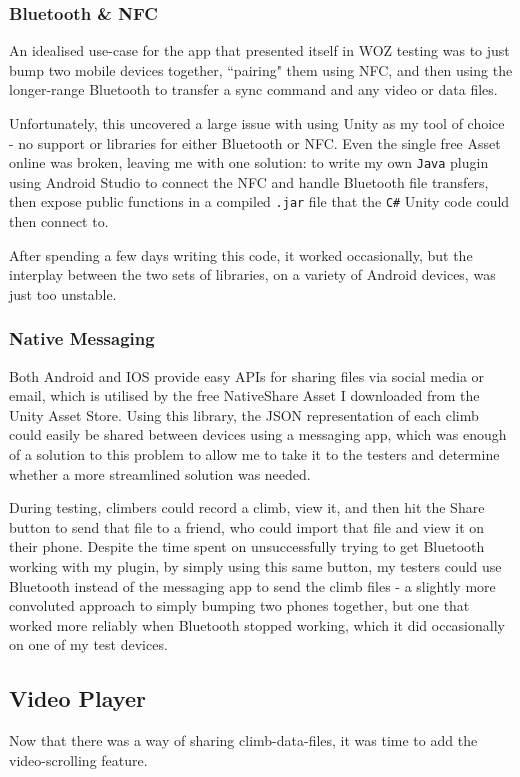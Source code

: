 \subsubsection{Bluetooth \& NFC}
An idealised use-case for the app that presented itself in WOZ testing was to just bump two mobile devices together, ``pairing" them using NFC, and then using the longer-range Bluetooth to transfer a sync command and any video or data files.

Unfortunately, this uncovered a large issue with using Unity as my tool of choice - no support or libraries for either Bluetooth or NFC. 
Even the single free Asset online was broken, leaving me with one solution: to write my own \verb|Java| plugin using Android Studio to connect the NFC and handle Bluetooth file transfers, then expose public functions in a compiled \verb|.jar| file that the \verb|C#| Unity code could then connect to.

After spending a few days writing this code, it worked occasionally, but the interplay between the two sets of libraries, on a variety of Android devices, was just too unstable.

\subsubsection{Native Messaging}
Both Android and IOS provide easy APIs for sharing files via social media or email, which is utilised by the free NativeShare Asset I downloaded from the Unity Asset Store.
Using this library, the JSON representation of each climb could easily be shared between devices using a messaging app, which was enough of a solution to this problem to allow me to take it to the testers and determine whether a more streamlined solution was needed.

During testing, climbers could record a climb, view it, and then hit the Share button to send that file to a friend, who could import that file and view it on their phone.
Despite the time spent on unsuccessfully trying to get Bluetooth working with my plugin, by simply using this same button, my testers could use Bluetooth instead of the messaging app to send the climb files - a slightly more convoluted approach to simply bumping two phones together, but one that worked more reliably when Bluetooth stopped working, which it did occasionally on one of my test devices.


\subsection{Video Player}
Now that there was a way of sharing climb-data-files, it was time to add the video-scrolling feature.


